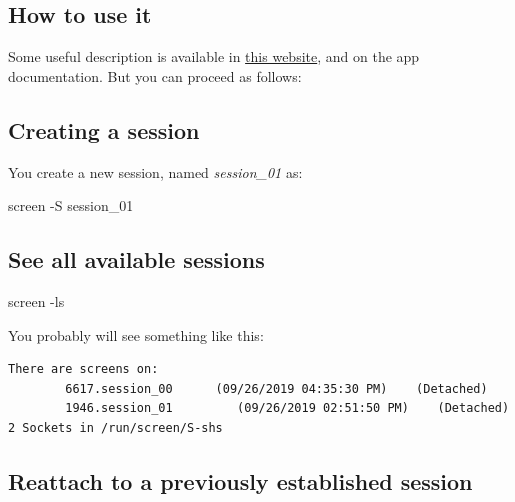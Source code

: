 \documentclass[
]{book}
\newenvironment{Shaded}{\begin{snugshade}}{\end{snugshade}}
\newcommand{\AttributeTok}[1]{\textcolor[rgb]{0.77,0.63,0.00}{#1}}
\newcommand{\ExtensionTok}[1]{#1}
\newcommand{\NormalTok}[1]{#1}
\begin{document}
\hypertarget{how-to-use-it}{%
\subsection{How to use it}\label{how-to-use-it}}

Some useful description is available in \href{https://web.archive.org/web/20230606181644/https://www.networkworld.com/article/3441777/how-the-linux-screen-tool-can-save-your-tasks-and-your-sanity-if-ssh-is-interrupted.html}{this website}, and on the app documentation. But you can proceed as follows:

\hypertarget{creating-a-session}{%
\subsection{Creating a session}\label{creating-a-session}}

You create a new session, named \emph{session\_01} as:

\begin{Shaded}
\begin{Highlighting}[]
\ExtensionTok{screen} \AttributeTok{{-}S}\NormalTok{ session\_01}
\end{Highlighting}
\end{Shaded}

\hypertarget{see-all-available-sessions}{%
\subsection{See all available sessions}\label{see-all-available-sessions}}

\begin{Shaded}
\begin{Highlighting}[]
\ExtensionTok{screen} \AttributeTok{{-}ls}
\end{Highlighting}
\end{Shaded}

You probably will see something like this:

\begin{verbatim}
There are screens on:
        6617.session_00      (09/26/2019 04:35:30 PM)    (Detached)
        1946.session_01         (09/26/2019 02:51:50 PM)    (Detached)
2 Sockets in /run/screen/S-shs
\end{verbatim}

\hypertarget{reattach-to-a-previously-established-session}{%
\subsection{Reattach to a previously established session}\label{reattach-to-a-previously-established-session}}
\end{document}
